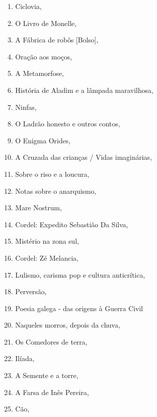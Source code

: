 \begin{multicols}{2}
\begin{enumerate}
\item Ciclovia, {}
\item O Livro de Monelle, {}
\item A Fábrica de robôs [Bolso], {}
\item Oração aos moços, {}
\item A Metamorfose, {}
\item História de Aladim e a lâmpada maravilhosa, {}
\item Ninfas, {}
\item O Ladrão honesto e outros contos, {}
\item O Enigma Orides, {}
\item A Cruzada das crianças / Vidas imaginárias, {}
\item Sobre o riso e a loucura, {}
\item Notas sobre o anarquismo, {}
\item Mare Nostrum, {}
\item Cordel: Expedito Sebastião Da Silva, {}
\item Mistério na zona sul, {}
\item Cordel: Zé Melancia, {}
\item Lulismo, carisma pop e cultura anticrítica, {}
\item Perversão, {}
\item Poesia galega - das origens à Guerra Civil
\item Naqueles morros, depois da chuva, {}
\item Os Comedores de terra, {}
\item Ilíada, {}
\item A Semente e a torre, {}
\item A Farsa de Inês Pereira, {}
\item Cão, {}

\end{enumerate}
\end{multicols}

